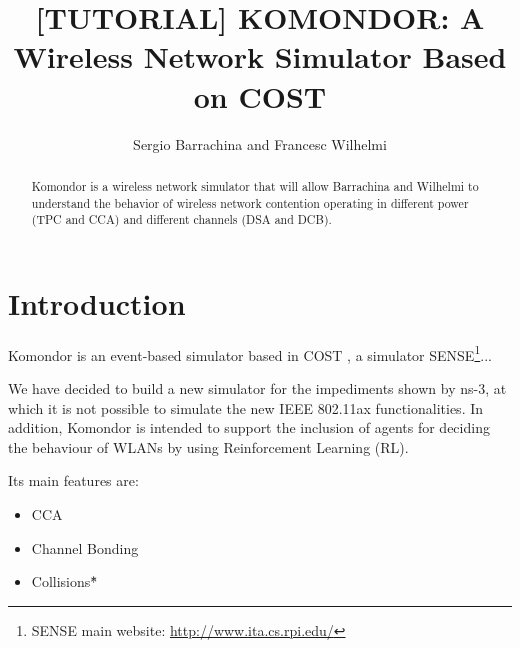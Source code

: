 \documentclass[a4paper]{article}
\title{[TUTORIAL] KOMONDOR: A Wireless Network Simulator Based on COST}
\author{Sergio Barrachina and Francesc Wilhelmi}
\begin{document}
\maketitle

\begin{abstract}
Komondor is a wireless network simulator that will allow Barrachina and Wilhelmi to understand the behavior of wireless network contention operating in different power (TPC and CCA) and different channels (DSA and DCB). 
\end{abstract}

\tableofcontents


\section{Introduction}
Komondor is an event-based simulator based in COST \cite{ref:cost}, a simulator SENSE\footnote{SENSE main website: \url{http://www.ita.cs.rpi.edu/}}...
% 
% 

% 
% 

% 
% 
We have decided to build a new simulator for the impediments shown by ns-3, at which it is not possible to simulate the new IEEE 802.11ax functionalities. In addition, Komondor is intended to support the inclusion of agents for deciding the behaviour of WLANs by using Reinforcement Learning (RL).

Its main features are:
\begin{itemize}
\item CCA
\item Channel Bonding
\item Collisions\^{*}
\end{itemize}

% 
% 

\end{document}
